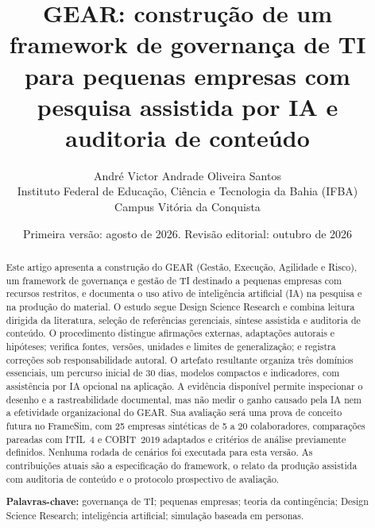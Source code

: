 \documentclass[11pt,a4paper]{article}
\title{\textbf{GEAR: construção de um framework de governança de TI para pequenas empresas com pesquisa assistida por IA e auditoria de conteúdo}}
\author{Andr\'{e} Victor Andrade Oliveira Santos\\
Instituto Federal de Educa\c{c}\~{a}o, Ci\^{e}ncia e Tecnologia da Bahia (IFBA)\\
Campus Vit\'{o}ria da Conquista}
\date{Primeira versão: agosto de 2026. Revisão editorial: outubro de 2026}
\begin{document}
\maketitle

\begin{center}
\end{center}

\begin{abstract}
Este artigo apresenta a construção do GEAR (Gestão, Execução, Agilidade e Risco), um framework de governança e gestão de TI destinado a pequenas empresas com recursos restritos, e documenta o uso ativo de inteligência artificial (IA) na pesquisa e na produção do material. O estudo segue Design Science Research e combina leitura dirigida da literatura, seleção de referências gerenciais, síntese assistida e auditoria de conteúdo. O procedimento distingue afirmações externas, adaptações autorais e hipóteses; verifica fontes, versões, unidades e limites de generalização; e registra correções sob responsabilidade autoral. O artefato resultante organiza três domínios essenciais, um percurso inicial de 30 dias, modelos compactos e indicadores, com assistência por IA opcional na aplicação. A evidência disponível permite inspecionar o desenho e a rastreabilidade documental, mas não medir o ganho causado pela IA nem a efetividade organizacional do GEAR. Sua avaliação será uma prova de conceito futura no FrameSim, com 25 empresas sintéticas de 5 a 20 colaboradores, comparações pareadas com ITIL~4 e COBIT~2019 adaptados e critérios de análise previamente definidos. Nenhuma rodada de cenários foi executada para esta versão. As contribuições atuais são a especificação do framework, o relato da produção assistida com auditoria de conteúdo e o protocolo prospectivo de avaliação.

\noindent\textbf{Palavras-chave:} governança de TI; pequenas empresas; teoria da contingência; Design Science Research; inteligência artificial; simulação baseada em personas.
\end{abstract}
\end{document}
